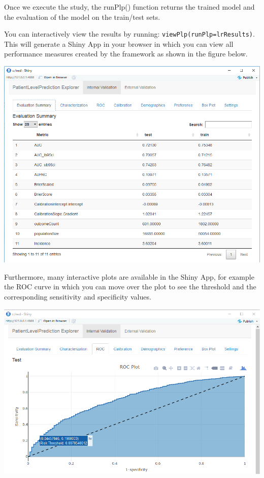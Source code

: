 \documentclass[]{book}
\begin{document}
Once we execute the study, the runPlp() function returns the trained
model and the evaluation of the model on the train/test sets.

You can interactively view the results by running:
\texttt{viewPlp(runPlp=lrResults)}. This will generate a Shiny App in
your browser in which you can view all performance measures created by
the framework as shown in the figure below.

\includegraphics{images/PatientLevelPrediction/shinysummary.png}

Furthermore, many interactive plots are available in the Shiny App, for
example the ROC curve in which you can move over the plot to see the
threshold and the corresponding sensitivity and specificity values.

\includegraphics{images/PatientLevelPrediction/shinyroc.png}
\end{document}

